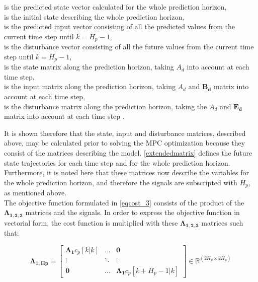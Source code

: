  \begin{minipage}[t]{0.67\textwidth}
 \vspace*{2mm}
 is the predicted state vector calculated for the whole prediction horizon, \\
 is the initial state describing the whole prediction horizon, \\
 is the predicted input vector consisting of all the predicted values from the current time step until $k = H_p-1$, \\
 is the disturbance vector consisting of all the future values from the current time step until $k = H_p-1$, \\
 is the state matrix along the prediction horizon, taking $A_d$ into account at each time step, \\
 is the input matrix along the prediction horizon, taking $A_d$ and $\bm{B_d}$ matrix into account at each time step, \\
 is the disturbance matrix along the prediction horizon, taking the $A_d$ and $\bm{E_d}$ matrix into account at each time step . \\ 
 \end{minipage}

It is shown therefore that the state, input and disturbance matrices, described above, may be calculated prior to solving the MPC optimization because they consist of the matrices describing the model. \eqref{extendedmatrix} defines the future state trajectories for each time step and for the whole prediction horizon. Furthermore, it is noted here that these matrices now describe the variables for the whole prediction horizon, and therefore the signals are subscripted with $H_p$, as mentioned above. 
\\
\newline
The objective function formulated in \eqref{eqcost_3} consists of the product of the $\bm{\Lambda_{1,2,3}}$ matrices and the signals. In order to express the objective function in vectorial form, the cost function is multiplied with these $\bm{\Lambda_{1,2,3}}$ matrices such that:

\begin{equation}
\bm{\Lambda_{1,Hp}} =
 \begin{bmatrix}
 \bm{\Lambda_1} c_p[k|k] & \hdots & \bm{0} \\
 \vdots & \ddots & \vdots\\
 \bm{0} & \hdots & \bm{\Lambda_1} c_p[k+H_p-1|k] 
 \end{bmatrix}
 \in \pmb{\mathbb{R}}^{(2 H_p \times 2 H_p)}
\end{equation} 


